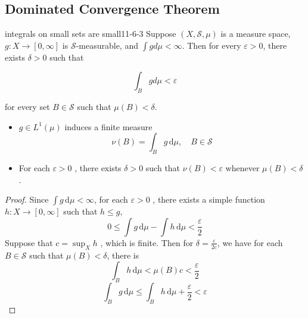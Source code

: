 \documentclass[../main.tex]{subfiles}
\begin{document}
\subsection{Dominated Convergence Theorem}
\begin{proposition}{integrals on small sets are small}{11-6-3}
Suppose $(X, \mathcal{S}, \mu)$ is a measure space, $g: X \to [0, \infty]$ is $\mathcal{S}$-measurable, and $\int g d\mu < \infty$. Then for every $\varepsilon > 0$, there exists $\delta > 0$ such that

\[
\int_B g d\mu < \varepsilon
\]

for every set $B \in \mathcal{S}$ such that $\mu(B) < \delta$.
\end{proposition}

\begin{remark}
    \begin{itemize}
        \item \(  g\in L^{1}\left( \mu  \right)   \) induces a finite measure \[
        \nu \left( B \right)=  \int_{B}g \,\mathrm{d} \mu ,\quad B\in \mathcal{S}
        \] 
        \item For each \(   \varepsilon > 0  \) , there exists \(   \delta > 0  \) such that \(  \nu \left( B \right)<  \varepsilon    \) whenever \(  \mu \left( B \right)<  \delta    \).    
    \end{itemize}
    
\end{remark}
\begin{proof}
    Since \(  \int g\,\mathrm{d} \mu   < \infty\), for each \(   \varepsilon > 0  \) , there exists a simple function \(  h:X\to \left[ 0,\infty \right]   \) such that \(  h\le g  \),   \[
    0\le \int g\,\mathrm{d} \mu - \int h \,\mathrm{d} \mu < \frac{ \varepsilon  }{2 } 
    \] Suppose that \(  c= \sup _{X}h  \)    , which is finite. Then for \(   \delta = \frac{ \varepsilon  }{2c }   \), we have for each \(  B\in \mathcal{S}  \) such that \(  \mu \left( B \right)<  \delta    \), there is  \[
    \int_{B} h \,\mathrm{d} \mu < \mu \left( B \right)c < \frac{ \varepsilon  }{2 } 
    \]  \[
    \int_{B}g\,\mathrm{d} \mu \le  \int _{B} h \,\mathrm{d} \mu + \frac{ \varepsilon  }{2 } <  \varepsilon 
    \]
\end{proof}
\end{document}
